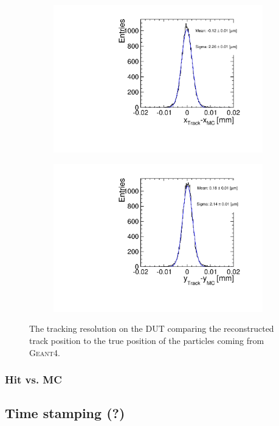 \begin{figure}[htbp] \centering
  \begin{subfigure}[b]{0.45\textwidth}
    \includegraphics[width=\textwidth]{./figures/Telescope/run49_x_track_MC_DUT.pdf}
    \caption{}
  \end{subfigure}\hfill
  \begin{subfigure}[b]{0.45\textwidth}
    \includegraphics[width=\textwidth]{./figures/Telescope/run49_y_track_MC_DUT.pdf}
    \caption{}
  \end{subfigure}
  \caption{The tracking resolution on the DUT comparing the
    reconstructed track position to the true position of the particles
    coming from \textsc{Geant4}.}
  \label{fig:UnbiasedResidualOnDUT}
\end{figure}



\subsubsection{Hit vs. MC}

\subsection{Time stamping (?)}
